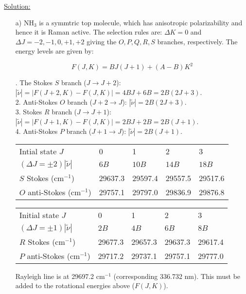 \noindent
\underline{Solution:}\\

\noindent
\begin{itemize}

\item[a)] NH$_3$ is a symmtric top molecule, which has anisotropic polarizability and hence it is Raman active. The selection rules are: $\Delta K = 0$ and $\Delta J = -2, -1, 0, +1, +2$ giving the $O,P,Q,R,S$ branches, respectively. The energy levels are given by:

$$F(J,K) = BJ(J+1) + (A - B)K^2$$

. The Stokes $S$ branch ($J \rightarrow J+2$): $\left|\tilde{\nu}\right| = \left|F(J+2,K) - F(J,K)\right| = 4BJ + 6B = 2B(2J + 3)$.\\
2. Anti-Stokes $O$ branch ($J+2 \rightarrow J$): $\left|\tilde{\nu}\right| = 2B(2J + 3)$.\\
3. Stokes $R$ branch ($J \rightarrow J+1$): $\left|\tilde{\nu}\right| = \left|F(J+1,K) - F(J,K)\right| = 2BJ + 2B = 2B(J+1)$.\\
4. Anti-Stokes $P$ branch ($J+1 \rightarrow J$): $\left|\tilde{\nu}\right| = 2B(J+1)$.\\

\noindent
\begin{tabular}{lllll}
Intial state $J$ & 0 & 1 & 2 & 3\\
$\left(\Delta J = \pm 2\right)\left|\tilde{\nu}\right|$ & $6B$ & $10B$ & $14B$ & $18B$\\
\cline{1-5}
$S$ Stokes (cm$^{-1}$) & 29637.3 & 29597.4 & 29557.5 & 29517.6\\
$O$ anti-Stokes (cm$^{-1}$) & 29757.1 & 29797.0 & 29836.9 & 29876.8\\
\end{tabular}

\begin{tabular}{lllll}
Initial state $J$ & 0 & 1 & 2 & 3\\
$\left(\Delta J = \pm 1\right)\left|\tilde{\nu}\right|$ & $2B$ & $4B$ & $6B$ & $8B$\\
\cline{1-5}
$R$ Stokes (cm$^{-1}$) & 29677.3 & 29657.3 & 29637.3 & 29617.4\\
$P$ anti-Stokes (cm$^{-1}$) & 29717.2 & 29737.1 & 29757.1 & 29777.0\\
\end{tabular}

\noindent
Rayleigh line is at 29697.2 cm$^{-1}$ (corresponding 336.732 nm). This must be added to the rotational energies above ($F(J,K)$).


\end{itemize}
